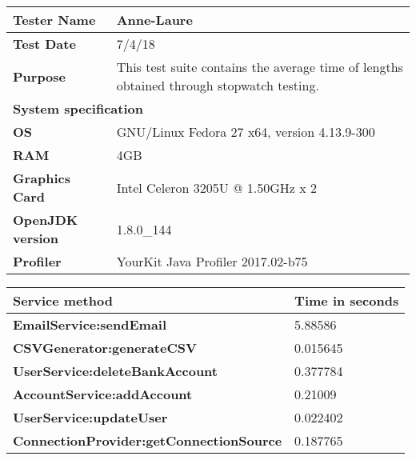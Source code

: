 \begin{longtable}{|m{4cm}|l|}
\hline
\cellcolor[HTML]{C0C0C0}\textbf{Tester Name} & \multicolumn{1}{p{13cm}|}{Anne-Laure}\\ \hline
\cellcolor[HTML]{C0C0C0}\textbf{Test Date} & \multicolumn{1}{p{13cm}|}{7/4/18}\\ \hline
\cellcolor[HTML]{C0C0C0}\textbf{Purpose} & \multicolumn{1}{p{13cm}|}{This test suite contains the average time of lengths obtained through stopwatch testing.}\\ \hline
\multicolumn{2}{|l|}{\cellcolor[HTML]{C0C0C0}\textbf{System specification}}\\ \hline
\cellcolor[HTML]{C0C0C0}\textbf{OS} & \multicolumn{1}{p{13cm}|}{GNU/Linux Fedora 27 x64, version 4.13.9-300}\\ \hline
\cellcolor[HTML]{C0C0C0}\textbf{RAM} & \multicolumn{1}{p{13cm}|}{4GB}\\ \hline
\cellcolor[HTML]{C0C0C0}\textbf{Graphics Card} & \multicolumn{1}{p{13cm}|}{Intel Celeron 3205U @ 1.50GHz x 2}\\ \hline
\cellcolor[HTML]{C0C0C0}\textbf{OpenJDK version} & \multicolumn{1}{p{13cm}|}{1.8.0\_144}\\ \hline
\cellcolor[HTML]{C0C0C0}\textbf{Profiler} & \multicolumn{1}{p{13cm}|}{YourKit Java Profiler 2017.02-b75}\\ \hline
\end{longtable}

\begin{longtable}{|m{9cm}|l|}
\hline
\cellcolor[HTML]{C0C0C0}\textbf{Service method} & \multicolumn{1}{p{8cm}|}{\cellcolor[HTML]{C0C0C0}\textbf{Time in seconds}}\\ \hline
\cellcolor[HTML]{C0C0C0}\textbf{EmailService:sendEmail} & \multicolumn{1}{p{8cm}|}{5.88586}\\ \hline
\cellcolor[HTML]{C0C0C0}\textbf{CSVGenerator:generateCSV} & \multicolumn{1}{p{8cm}|}{0.015645}\\ \hline
\cellcolor[HTML]{C0C0C0}\textbf{UserService:deleteBankAccount} & \multicolumn{1}{p{8cm}|}{0.377784}\\ \hline
\cellcolor[HTML]{C0C0C0}\textbf{AccountService:addAccount} & \multicolumn{1}{p{8cm}|}{0.21009}\\ \hline
\cellcolor[HTML]{C0C0C0}\textbf{UserService:updateUser} & \multicolumn{1}{p{8cm}|}{0.022402}\\ \hline
\cellcolor[HTML]{C0C0C0}\textbf{ConnectionProvider:getConnectionSource} & \multicolumn{1}{p{8cm}|}{0.187765}\\ \hline
\end{longtable}

